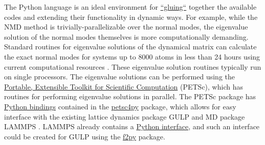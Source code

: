 The Python language is an ideal environment for 
\href{http://docs.scipy.org/doc/numpy/user/c-info.python-as-glue.html}
{``gluing``} together 
the available codes and extending their functionality in dynamic ways. 
For example, while the NMD method is trivially-parallelizable over 
the normal modes, the eigenvalue solution of the normal modes themselves 
is more computationally demanding. 
Standard routines for eigenvalue solutions of the dynamical matrix can 
calculate the exact normal modes for systems up to 8000 atoms 
in less than 24 hours using current computational resources 
\cite{gale_general_2003}. 
These eigenvalue solution routines typically run on single 
processors. 
The eigenvalue solutions can be performed using the 
\href{http://www.mcs.anl.gov/petsc/}{Portable, Extensible 
Toolkit for Scientific Computation} (PETSc), which has routines for 
performing eigenvalue solutions in parallel. The PETSc package has 
\href{http://wiki.python.org/moin/IntegratingPythonWithOtherLanguages}
{Python bindings} contained in the 
\href{https://code.google.com/p/petsc4py/}{petsc4py} 
package, which allows for easy interface with the existing lattice 
dynamics package GULP\cite{gale_general_2003} and MD package LAMMPS 
\cite{plimpton_fast_1995}. LAMMPS already contains a 
\href{http://lammps.sandia.gov/doc/Section_python.html}{Python interface}, 
and such an interface could be created for GULP using the 
\href{https://github.com/thehackerwithin/PyTrieste/wiki/F2Py}
{f2py} package.



% 

